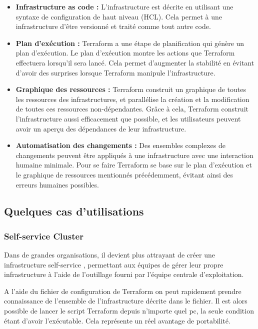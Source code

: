 \documentclass[]{article}
\begin{document}
\begin{itemize}
\item
  \textbf{Infrastructure as code :} L'infrastructure est décrite en
  utilisant une syntaxe de configuration de haut niveau (HCL). Cela
  permet à une infrastructure d'être versionné et traité comme tout autre
  code.
\item
  \textbf{Plan d'exécution :} Terraform a une étape de \og
  planification \fg qui génère un plan d'exécution. Le
  plan d'exécution montre les actions que Terraform effectuera lorsqu'il
  sera lancé. Cela permet d'augmenter la stabilité en évitant d'avoir des
  surprises lorsque Terraform manipule l'infrastructure.
\item
  \textbf{Graphique des ressources :} Terraform construit un graphique de
  toutes les ressources des infrastructures, et parallélise la création
  et la modification de toutes ces ressources non-dépendantes. Grâce à
  cela, Terraform construit l'infrastructure aussi efficacement que
  possible, et les utilisateurs peuvent avoir un aperçu des dépendances
  de leur infrastructure.
\item
  \textbf{Automatisation des changements :} Des ensembles complexes de
  changements peuvent être appliqués à une infrastructure avec une
  interaction humaine minimale. Pour se faire Terraform se base sur le
  plan d'exécution et le graphique de ressources mentionnés
  précédemment, évitant ainsi des erreurs humaines possibles.
\end{itemize}

\subsection{Quelques cas d'utilisations}\label{quelques-cas-dutilisations}

\subsubsection{Self-service Cluster}\label{self-service-cluster}

Dans de grandes organisations, il devient plus attrayant de créer une
infrastructure \og self-service \fg,
permettant aux équipes de gérer leur propre infrastructure à l'aide de
l'outillage fourni par l'équipe centrale d'exploitation.

A l'aide du fichier de configuration de Terraform on peut rapidement prendre connaissance de l'ensemble de l'infrastructure décrite dans le fichier. Il est alors possible de lancer le script Terraform depuis n'importe quel pc, la seule condition étant d'avoir l'exécutable. Cela représente un réel avantage de portabilité.
\end{document}
